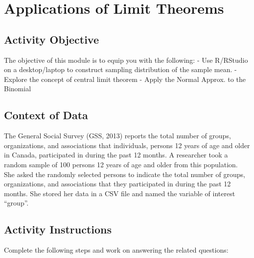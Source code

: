 \documentclass[oneside,openany]{book}
\begin{document}
\chapter{Applications of Limit Theorems}\label{activity-4---applications-of-limit-theorems}

\section{Activity Objective}\label{activity-objective-1}

The objective of this module is to equip you with the following:
- Use R/RStudio on a desktop/laptop to construct sampling distribution of the sample mean.
- Explore the concept of central limit theorem
- Apply the Normal Approx. to the Binomial

\section{Context of Data}\label{context-of-data}

The General Social Survey (GSS, 2013) reports the total number of groups, organizations, and associations that individuals, persons 12 years of age and older in Canada, participated in during the past 12 months. A researcher took a random sample of 100 persons 12 years of age and older from this population. She asked the randomly selected persons to indicate the total number of groups, organizations, and associations that they participated in during the past 12 months. She stored her data in a CSV file and named the variable of interest ``group''.

\section{Activity Instructions}\label{activity-instructions}

Complete the following steps and work on answering the related questions:
\end{document}
